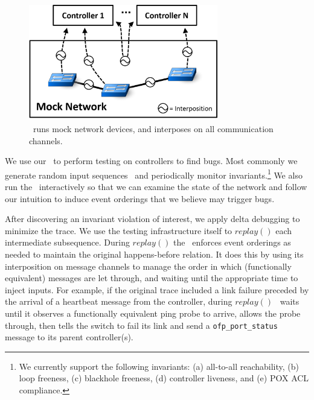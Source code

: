 \begin{figure}[tb]
    \includegraphics[width=3.25in]{../diagrams/architecture/Debugger_Architecture.png}
    \caption[]{\label{fig:architecture} \projectname~runs mock
    network devices, and interposes on all communication
    channels.}
    \vspace{-1em}
\end{figure}

We use our \tester~to perform testing on controllers to find
bugs. Most commonly we generate random input
sequences~\cite{Miller:1990:ESR:96267.96279} and periodically monitor invariants.\footnote{We currently support the following invariants:
  (a) all-to-all reachability, (b) loop freeness, (c) blackhole freeness, (d) controller
liveness, and (e) POX ACL compliance.
}
We also run the \tester~interactively
so that we can examine the state of the network
and follow our intuition to induce event orderings that we believe may trigger bugs.

 After discovering an invariant
violation of interest, we apply delta debugging to minimize the trace. We use the
testing infrastructure itself to $replay()$ each intermediate subsequence.
During $replay()$ the \tester~enforces event orderings as needed to maintain the original happens-before
relation. It does this by using its interposition on message channels to
manage the order in which (functionally equivalent) messages are let through,
and waiting until the appropriate time to inject inputs. For example, if the
original trace included a link failure preceded by the arrival of a heartbeat
message from the controller, during $replay()$ \tester~waits until it observes
a functionally equivalent ping probe to arrive, allows the probe
through, then tells the switch to fail its link and send a \verb=ofp_port_status=
message to its parent controller(s).

